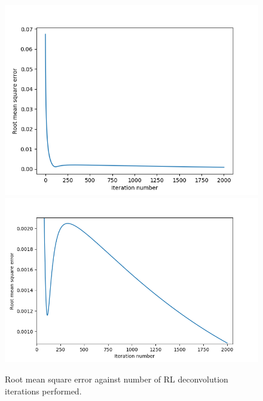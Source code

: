 \documentclass[12pt, titlepage]{article}
\begin{document}
\begin{figure}[h]
    \includegraphics[scale=0.4]{rms_error-SimNoise3exp_PSF.png}
    \includegraphics[scale=0.4]{rms_error-SimNoise3exp_PSF2.png}
    \caption{Root mean square error against number of RL deconvolution
        iterations performed. \label{fig:RMS}}
\end{figure}
\end{document}
